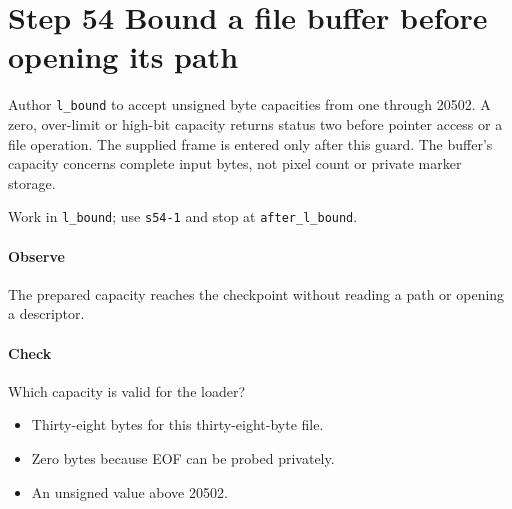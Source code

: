 \section{Step 54 Bound a file buffer before opening its path}\label{qoi-s54}
Author \texttt{l\_bound} to accept unsigned byte capacities from one through 20502. A zero, over-limit or high-bit capacity returns status two before pointer access or a file operation. The supplied frame is entered only after this guard. The buffer’s capacity concerns complete input bytes, not pixel count or private marker storage.

Work in \texttt{l\_bound}; use \texttt{s54-1} and stop at \texttt{after\_l\_bound}.

\paragraph{Observe} The prepared capacity reaches the checkpoint without reading a path or opening a descriptor.

\paragraph{Check} Which capacity is valid for the loader?
\begin{itemize}
  \item[A.] Thirty-eight bytes for this thirty-eight-byte file.
  \item[B.] Zero bytes because EOF can be probed privately.
  \item[C.] An unsigned value above 20502.
\end{itemize}
